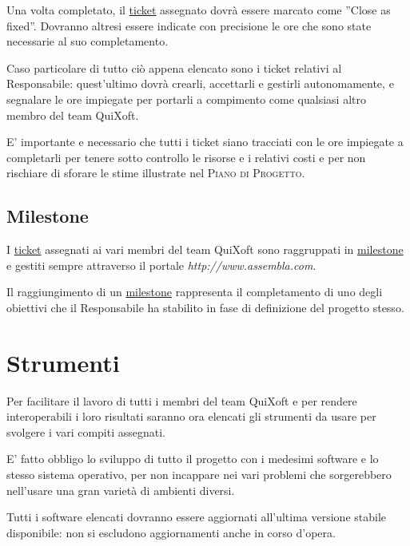 \documentclass[11pt,a4paper]{article}
\begin{document}
Una volta completato, il \underline{ticket} assegnato dovrà essere marcato come ''Close as fixed''. Dovranno altresi essere indicate con precisione le ore che sono state necessarie al suo completamento.

Caso particolare di tutto ciò appena elencato sono i ticket relativi al Responsabile: quest'ultimo dovrà crearli, accettarli e gestirli autonomamente, e segnalare le ore impiegate per portarli a compimento come qualsiasi altro membro del team QuiXoft.

E' importante e necessario che tutti i ticket siano tracciati con le ore impiegate a completarli per tenere sotto controllo le risorse e i relativi costi e per non rischiare di sforare le stime illustrate nel \textsc{Piano di Progetto}.
\subsection{Milestone}
I \underline{ticket} assegnati ai vari membri del team QuiXoft sono raggruppati in \underline{milestone} e gestiti sempre attraverso il portale \textit{http://www.assembla.com}.

Il raggiungimento di un \underline{milestone} rappresenta il completamento di uno degli obiettivi che il Responsabile ha stabilito in fase di definizione del progetto stesso.
\section{Strumenti}
Per facilitare il lavoro di tutti i membri del team QuiXoft e per rendere interoperabili i loro risultati saranno ora elencati gli strumenti da usare per svolgere i vari compiti assegnati.

E' fatto obbligo lo sviluppo di tutto il progetto con i medesimi software e lo stesso sistema operativo, per non incappare nei vari problemi che sorgerebbero nell'usare una gran varietà di ambienti diversi.

Tutti i software elencati dovranno essere aggiornati all'ultima versione stabile disponibile: non si escludono aggiornamenti anche in corso d'opera.
\end{document}
